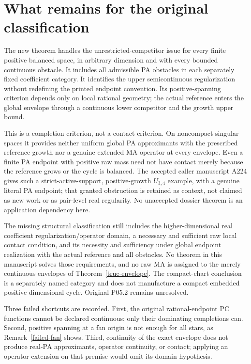 \documentclass[11pt]{article}
\begin{document}
\section{What remains for the original classification}
The new theorem handles the unrestricted-competitor issue for every finite positive balanced space, in arbitrary dimension and with every bounded continuous obstacle. It includes all admissible PA obstacles in each separately fixed coefficient category. It identifies the upper semicontinuous regularization without redefining the printed endpoint convention. Its positive-spanning criterion depends only on local rational geometry; the actual reference enters the global envelope through a continuous lower competitor and the growth upper bound.

This is a completion criterion, not a contact criterion. On noncompact singular spaces it provides neither uniform global PA approximants with the prescribed reference growth nor a genuine extended MA operator at every envelope. Even a finite PA endpoint with positive raw mass need not have contact merely because the reference grows or the cycle is balanced. The accepted caller manuscript A224 gives such a strict-active-support, positive-growth $U_{3,4}$ example, with a genuine literal PA endpoint; that granted obstruction is retained as context, not claimed as new work or as pair-level real regularity. No unaccepted dossier theorem is an application dependency here.

The missing structural classification still includes the higher-dimensional real coefficient regularization/operator domain, a necessary and sufficient raw local contact condition, and its necessity and sufficiency under global endpoint realization with the actual reference and all obstacles. No theorem in this manuscript solves those requirements, and no raw MA is assigned to the merely continuous envelopes of Theorem~\ref{true-envelope}. The compact-chart conclusion is a separately named category and does not manufacture a compact embedded positive-dimensional cycle. Original P05.2 remains unresolved.

Three failed shortcuts are recorded. First, the original rational-endpoint PC functions cannot be declared continuous; only their dominating completions can. Second, positive spanning at a fan origin is not enough for all stars, as Remark~\ref{failed-fan} shows. Third, continuity of the exact envelope does not produce real-PA approximants, operator continuity, or contact; applying an operator extension on that premise would omit its domain hypothesis.
\end{document}
